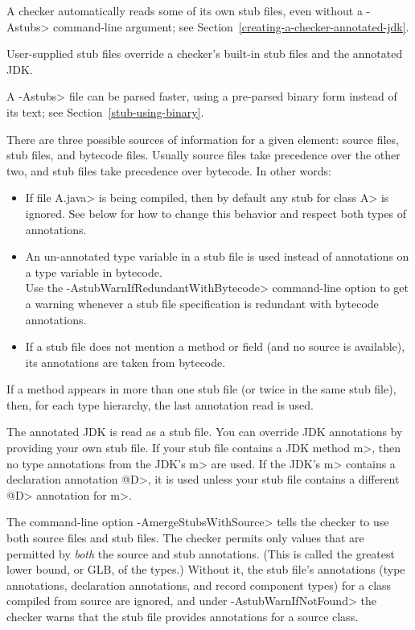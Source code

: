 A checker automatically reads some of its own stub files, even without a
\<-Astubs> command-line argument; see
Section~\ref{creating-a-checker-annotated-jdk}.

User-supplied stub files override a checker's built-in stub files and the
annotated JDK\@.

A \<-Astubs> file can be parsed faster, using a pre-parsed binary form
instead of its text; see Section~\ref{stub-using-binary}.



There are three possible sources of information for a given
element: source files, stub files, and bytecode files.
Usually source files take precedence over the other two,
and stub files take precedence over bytecode.
In other words:
\begin{itemize}
\item
  If file \<A.java> is being compiled, then by default any stub for class
  \<A> is ignored.  See below for how to change this behavior and respect
  both types of annotations.
\item
  An un-annotated type variable in a stub file is used instead of
  annotations on a type variable in bytecode.
  \\
  Use the \<-AstubWarnIfRedundantWithBytecode> command-line option to get a
  warning whenever a stub file specification is redundant with bytecode
  annotations.
\item
  If a stub file does not mention a method or field (and no source is
  available), its annotations are taken from bytecode.
\end{itemize}

If a method appears in more than one stub file (or twice in the same
stub file), then, for each type hierarchy, the last annotation read is used.

The annotated JDK is read as a stub file.
You can override JDK annotations by providing your own stub file.
If your stub file contains a JDK method \<m>, then no type annotations from
the JDK's \<m> are used.  If the JDK's \<m> contains a declaration
annotation \<@D>, it is used unless your stub file contains a different
\<@D> annotation for \<m>.

The command-line option \<-AmergeStubsWithSource> tells the checker to use
both source files and stub files.  The checker permits only values that are
permitted by \emph{both} the source and stub annotations.  (This is called
the greatest lower bound, or GLB, of the types.)
Without it, the stub file's annotations (type annotations, declaration
annotations, and record component types) for a class compiled from source
are ignored, and under \<-AstubWarnIfNotFound> the checker warns that the
stub file provides annotations for a source class.

